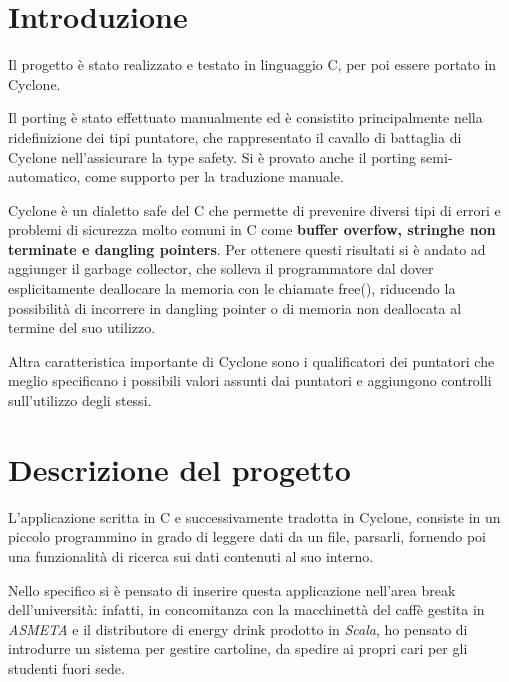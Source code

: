 \section{Introduzione}
Il progetto è stato realizzato e testato in linguaggio C, per poi essere portato in Cyclone.

Il porting è stato effettuato manualmente ed è consistito principalmente nella
ridefinizione dei tipi puntatore, che rappresentato il cavallo di battaglia di Cyclone
nell’assicurare la type safety.
Si è provato anche il porting semi-automatico, come supporto per la traduzione manuale.

Cyclone è un dialetto safe del C che permette di prevenire diversi tipi di errori e problemi di
sicurezza molto comuni in C come \textbf{buffer overfow, stringhe non terminate e dangling pointers}.
Per ottenere questi risultati si è andato ad aggiunger il garbage collector, che solleva il programmatore dal dover esplicitamente deallocare la memoria con le chiamate free(), riducendo la possibilità di incorrere in dangling pointer o di memoria non deallocata al termine del suo utilizzo.

Altra caratteristica importante di Cyclone sono i qualificatori dei puntatori che meglio
specificano i possibili valori assunti dai puntatori e aggiungono controlli sull'utilizzo degli stessi.

\section{Descrizione del progetto}

L'applicazione scritta in C e successivamente tradotta in Cyclone, consiste in un piccolo programmino in grado di leggere dati da un file, parsarli, fornendo poi una funzionalità di ricerca sui dati contenuti al suo interno.

Nello specifico si è pensato di inserire questa applicazione nell'area break dell'università: infatti, in concomitanza con la macchinettà del caffè gestita in \textit{ASMETA} e il distributore di energy drink prodotto in \textit{Scala}, ho pensato di introdurre un sistema per gestire cartoline, da spedire ai propri cari per gli studenti fuori sede.

